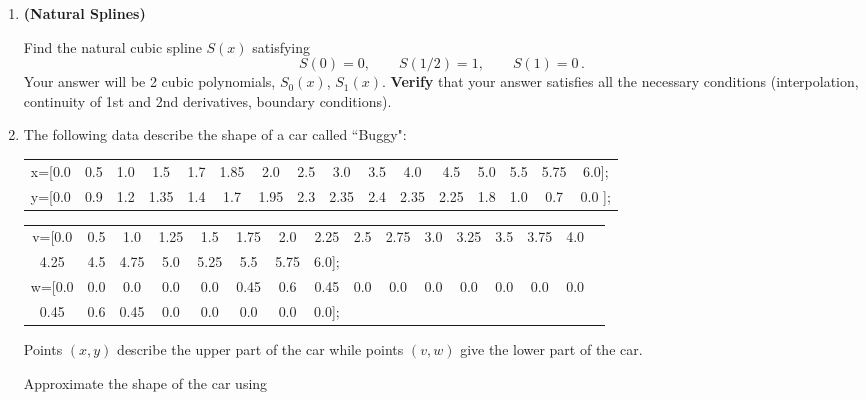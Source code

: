 \documentclass [12pt]{article}
\begin{document}
\begin{enumerate}

\item \textbf{(Natural Splines)}  

Find the natural cubic spline $S(x)$ satisfying \[
S(0)=0,\qquad S(1/2)=1,\qquad S(1)=0\,.\]
 Your answer will be 2 cubic polynomials, $S_{0}(x)$, $S_{1}(x)$.
\textbf{Verify} that your answer satisfies all the necessary
conditions (interpolation, continuity of 1st and 2nd derivatives,
boundary conditions).

\item The following data describe the shape of a car called
``Buggy":

\medskip

\begin{tabular}{cccccccccccccccc}
\hspace*{-50pt}x=[0.0 & 0.5 & 1.0 & 1.5 & 1.7 & 1.85 & 2.0 & 2.5 &
3.0 & 3.5 &
4.0 & 4.5 & 5.0 & 5.5 & 5.75 & 6.0]; \\[5pt]
\hspace*{-50pt}y=[0.0 & 0.9 & 1.2 & 1.35 & 1.4 & 1.7 & 1.95 & 2.3
& 2.35 & 2.4 & 2.35 & 2.25 & 1.8 & 1.0 & 0.7 & 0.0 ];
\end{tabular}

\medskip

\begin{tabular}{cccccccccccccccc}
\hspace*{-50pt} v=[0.0 & 0.5 & 1.0 & 1.25 & 1.5 & 1.75 & 2.0 &
2.25 & 2.5 & 2.75 & 3.0 & 3.25 & 3.5 & 3.75 & 4.0 \\[5pt]
\hspace*{-40pt}  4.25 & 4.5 & 4.75 & 5.0 & 5.25 & 5.5 &
5.75 & 6.0]; &&&&&& \\[10pt]
\hspace*{-50pt} w=[0.0 & 0.0 & 0.0 & 0.0 & 0.0 & 0.45 & 0.6 & 0.45
& 0.0 & 0.0 & 0.0 & 0.0 &  0.0 & 0.0 & 0.0 \\[5pt]
\hspace*{-40pt} 0.45 & 0.6 & 0.45 & 0.0 & 0.0 & 0.0 & 0.0 & 0.0];
&&&&&&
\end{tabular}

\medskip

\noindent
Points $(x,y)$ describe the upper part of the car while
points $(v,w)$ give the lower part of the car.

Approximate the shape of the car using

\begin{enumerate}


\end{enumerate}
\end{enumerate}
\end{document}
